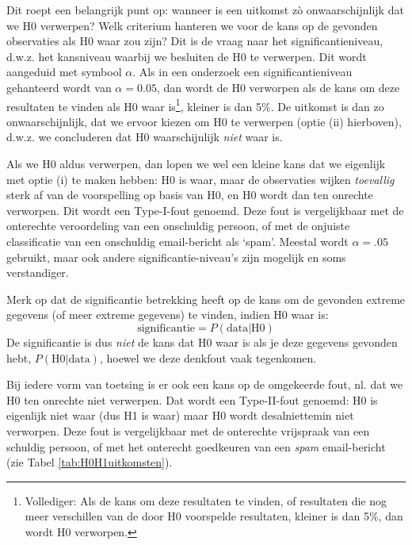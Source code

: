 \documentclass[
]{book}
\begin{document}
Dit roept een belangrijk punt op: wanneer is een uitkomst zò
onwaarschijnlijk dat we H0 verwerpen? Welk criterium hanteren we voor de
kans op de gevonden observaties als H0 waar zou zijn? Dit is de vraag
naar het significantieniveau, d.w.z. het kansniveau waarbij we besluiten
de H0 te verwerpen. Dit wordt aangeduid met symbool \(\alpha\). Als in een
onderzoek een significantieniveau gehanteerd wordt van \(\alpha = 0.05\),
dan wordt de H0 verworpen als de kans om deze resultaten te vinden als
H0 waar is\footnote{Vollediger: Als de kans om deze resultaten te vinden, of resultaten die nog meer verschillen van de door H0 voorspelde resultaten, kleiner is dan 5\%, dan wordt H0 verworpen.}, kleiner is dan 5\%. De uitkomst is dan zo
onwaarschijnlijk, dat we ervoor kiezen om H0 te verwerpen (optie (ii)
hierboven), d.w.z. we concluderen dat H0 waarschijnlijk \emph{niet} waar is.

Als we H0 aldus verwerpen, dan lopen we wel een kleine kans dat we
eigenlijk met optie (i) te maken hebben: H0 is waar, maar de observaties
wijken \emph{toevallig} sterk af van de voorspelling op basis van H0, en H0
wordt dan ten onrechte verworpen. Dit wordt een Type-I-fout genoemd.
Deze fout is vergelijkbaar met de onterechte veroordeling van een
onschuldig persoon, of met de onjuiste classificatie van een onschuldig
email-bericht als `spam'. Meestal wordt \(\alpha = .05\) gebruikt, maar
ook andere significantie-niveau's zijn mogelijk en soms verstandiger.

Merk op dat de significantie betrekking heeft op de kans om de gevonden
extreme gegevens (of meer extreme gegevens) te vinden, indien H0 waar
is: \[\textrm{significantie} = P(\textrm{data}|\textrm{H0})\] De
significantie is dus \emph{niet} de kans dat H0 waar is als je deze gegevens
gevonden hebt, \(P(\textrm{H0}|\textrm{data})\), hoewel we deze denkfout
vaak tegenkomen.

Bij iedere vorm van toetsing is er ook een kans op de omgekeerde fout,
nl. dat we H0 ten onrechte niet verwerpen. Dat wordt een Type-II-fout
genoemd: H0 is eigenlijk niet waar (dus H1 is waar) maar H0 wordt
desalniettemin niet verworpen. Deze fout is vergelijkbaar met de
onterechte vrijspraak van een schuldig persoon, of met het onterecht
goedkeuren van een \emph{spam} email-bericht (zie
Tabel \ref{tab:H0H1uitkomsten}).
\end{document}
